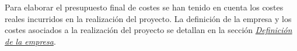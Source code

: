Para elaborar el presupuesto final de costes se han tenido en cuenta los costes reales incurridos en la realización del proyecto.
La definición de la empresa y los costes asociados a la realización del proyecto se detallan en la sección \hyperlink{sec:5-Definicion-empresa}{\textit{Definición de la empresa}}.